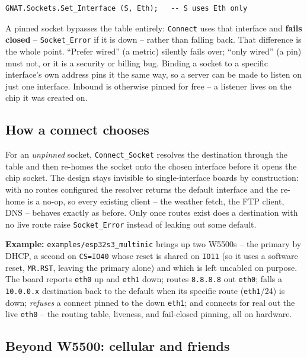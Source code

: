 \begin{lstlisting}
GNAT.Sockets.Set_Interface (S, Eth);   -- S uses Eth only
\end{lstlisting}

A pinned socket bypasses the table entirely: \texttt{Connect} uses that interface and
\textbf{fails closed} -- \texttt{Socket\_Error} if it is down -- rather than falling
back. That difference is the whole point. ``Prefer wired'' (a metric) silently fails
over; ``only wired'' (a pin) must not, or it is a security or billing bug. Binding a
socket to a specific interface's own address pins it the same way, so a server can be
made to listen on just one interface. Inbound is otherwise pinned for free -- a
listener lives on the chip it was created on.

\subsection{How a connect chooses}

For an \emph{unpinned} socket, \texttt{Connect\_Socket} resolves the destination
through the table and then re-homes the socket onto the chosen interface before it
opens the chip socket. The design stays invisible to single-interface boards by
construction: with no routes configured the resolver returns the default interface
and the re-home is a no-op, so every existing client -- the weather fetch, the FTP
client, DNS -- behaves exactly as before. Only once routes exist does a destination
with no live route raise \texttt{Socket\_Error} instead of leaking out some default.

\noindent\textbf{Example:} \texttt{examples/esp32s3\_multinic} brings up two W5500s
-- the primary by DHCP, a second on \texttt{CS=IO40} whose reset is shared on
\texttt{IO11} (so it uses a software reset, \texttt{MR.RST}, leaving the primary
alone) and which is left uncabled on purpose. The board reports \texttt{eth0} up and
\texttt{eth1} down; routes \texttt{8.8.8.8} out \texttt{eth0}; falls a \texttt{10.0.0.x}
destination back to the default when its specific route (\texttt{eth1}/24) is down;
\emph{refuses} a connect pinned to the down \texttt{eth1}; and connects for real out
the live \texttt{eth0} -- the routing table, liveness, and fail-closed pinning, all
on hardware.

\subsection{Beyond W5500: cellular and friends}

